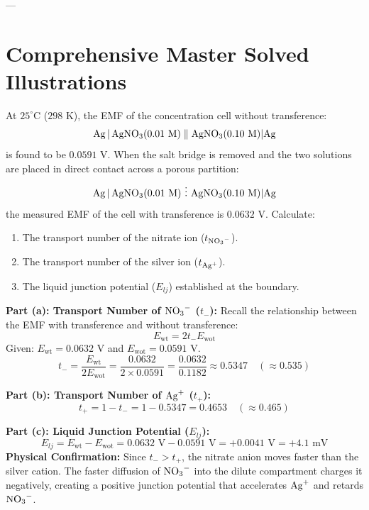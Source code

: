 ---

\section{Comprehensive Master Solved Illustrations}

\begin{examplebox}
At $25^\circ\text{C}$ ($298\text{ K}$), the EMF of the concentration cell without transference:
\begin{equation*}
    \ce{Ag | AgNO3}(0.01\text{ M}) \parallel \ce{AgNO3}(0.10\text{ M}) | \ce{Ag}
\end{equation*}
is found to be $0.0591\text{ V}$. When the salt bridge is removed and the two solutions are placed in direct contact across a porous partition:
\begin{equation*}
    \ce{Ag | AgNO3}(0.01\text{ M}) \ \vdots \ \ce{AgNO3}(0.10\text{ M}) | \ce{Ag}
\end{equation*}
the measured EMF of the cell with transference is $0.0632\text{ V}$.
Calculate:
\begin{enumerate}[label=(\alph*)]
    \item The transport number of the nitrate ion ($t_{\ce{NO3-}}$).
    \item The transport number of the silver ion ($t_{\ce{Ag+}}$).
    \item The liquid junction potential ($E_{lj}$) established at the boundary.
\end{enumerate}
\tcblower
\textbf{Part (a): Transport Number of $\ce{NO3-}$ ($t_-$):}
Recall the relationship between the EMF with transference and without transference:
\begin{equation*}
    E_{\text{wt}} = 2 t_- E_{\text{wot}}
\end{equation*}
Given: $E_{\text{wt}} = 0.0632\text{ V}$ and $E_{\text{wot}} = 0.0591\text{ V}$.
\begin{equation*}
    t_- = \frac{E_{\text{wt}}}{2 E_{\text{wot}}} = \frac{0.0632}{2 \times 0.0591} = \frac{0.0632}{0.1182} \approx 0.5347 \quad (\approx 0.535)
\end{equation*}

\textbf{Part (b): Transport Number of $\ce{Ag+}$ ($t_+$):}
\begin{equation*}
    t_+ = 1 - t_- = 1 - 0.5347 = 0.4653 \quad (\approx 0.465)
\end{equation*}

\textbf{Part (c): Liquid Junction Potential ($E_{lj}$):}
\begin{equation*}
    E_{lj} = E_{\text{wt}} - E_{\text{wot}} = 0.0632\text{ V} - 0.0591\text{ V} = +0.0041\text{ V} = +4.1\text{ mV}
\end{equation*}
\textbf{Physical Confirmation:}
Since $t_- > t_+$, the nitrate anion moves faster than the silver cation. The faster diffusion of $\ce{NO3-}$ into the dilute compartment charges it negatively, creating a positive junction potential that accelerates $\ce{Ag+}$ and retards $\ce{NO3-}$.
\end{examplebox}
